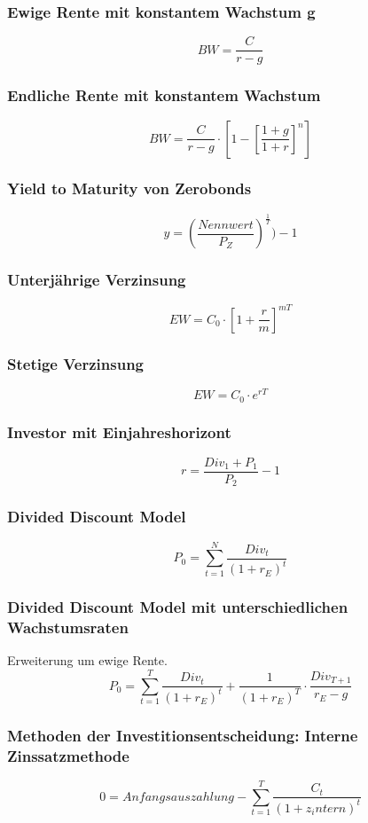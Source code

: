 \subsubsection{Ewige Rente mit konstantem Wachstum g}
\[BW = \frac{C}{r-g}\]

\subsubsection{Endliche Rente mit konstantem Wachstum}
\[BW = \frac{C}{r-g} \cdot [1-[\frac{1+g}{1+r}]^n]\]

\subsubsection{Yield to Maturity von Zerobonds}
\[y = (\frac{Nennwert}{P_Z})^{\frac{1}{T}})-1\]

\subsubsection{Unterjährige Verzinsung}
\[EW=C_0\cdot[1+\frac{r}{m}]^{mT}\]

\subsubsection{Stetige Verzinsung}
\[EW=C_0\cdot e^{rT}\]

\subsubsection{Investor mit Einjahreshorizont}
\[r = \frac{Div_1+P_1}{P_2}-1\]

\subsubsection{Divided Discount Model}
\[P_0 = \sum_{t=1}^{N} \frac{Div_t}{(1+r_E)^t}\]

\subsubsection{Divided Discount Model mit unterschiedlichen Wachstumsraten}
Erweiterung um ewige Rente.
\[P_0 = \sum_{t=1}^{T} \frac{Div_t}{(1+r_E)^t} + \frac{1}{(1+r_E)^T}\cdot\frac{Div_{T+1}}{r_E-g}\]

\subsubsection{Methoden der Investitionsentscheidung: Interne Zinssatzmethode}
\[0 = Anfangsauszahlung - \sum_{t=1}^{T}\frac{C_t}{(1+z_intern)^t}\]


